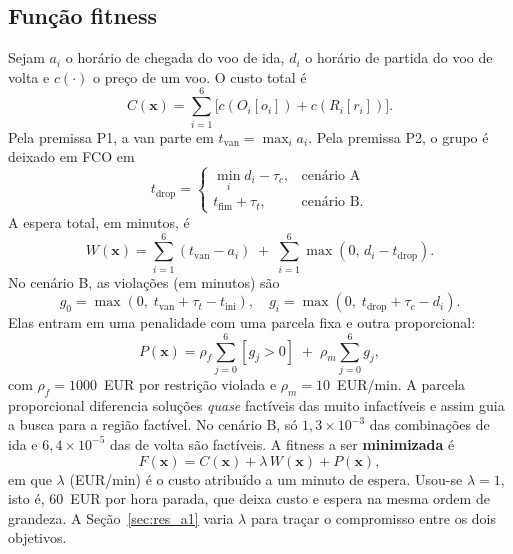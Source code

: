 \documentclass[conference]{IEEEtran}
\begin{document}
\subsection{Função fitness}
Sejam $a_i$ o horário de chegada do voo de ida, $d_i$ o horário de partida do voo de volta e $c(\cdot)$ o preço de um voo. O custo total é
\begin{equation}
C(\mathbf{x})=\sum_{i=1}^{6}\big[c(O_i[o_i])+c(R_i[r_i])\big].
\end{equation}
Pela premissa P1, a van parte em $t_{\text{van}}=\max_i a_i$. Pela premissa P2, o grupo é deixado em FCO em
\begin{equation}
t_{\text{drop}}=\begin{cases}\min_i d_i-\tau_c, & \text{cenário A}\\ t_{\text{fim}}+\tau_t, & \text{cenário B.}\end{cases}
\end{equation}
A espera total, em minutos, é
\begin{equation}
W(\mathbf{x})=\sum_{i=1}^{6}(t_{\text{van}}-a_i)\;+\;\sum_{i=1}^{6}\max(0,\,d_i-t_{\text{drop}}).
\end{equation}
No cenário B, as violações (em minutos) são
\begin{equation}
g_0=\max(0,\;t_{\text{van}}+\tau_t-t_{\text{ini}}),\quad
g_i=\max(0,\;t_{\text{drop}}+\tau_c-d_i).
\end{equation}
Elas entram em uma penalidade com uma parcela fixa e outra proporcional:
\begin{equation}
P(\mathbf{x})=\rho_f\sum_{j=0}^{6}[g_j>0]\;+\;\rho_m\sum_{j=0}^{6}g_j,
\end{equation}
com $\rho_f=1000$~EUR por restrição violada e $\rho_m=10$~EUR/min. A parcela proporcional diferencia soluções \emph{quase} factíveis das muito infactíveis e assim guia a busca para a região factível. No cenário B, só $1{,}3\times10^{-3}$ das combinações de ida e $6{,}4\times10^{-5}$ das de volta são factíveis. A fitness a ser \textbf{minimizada} é
\begin{equation}
F(\mathbf{x})=C(\mathbf{x})+\lambda\,W(\mathbf{x})+P(\mathbf{x}),
\label{eq:fitness}
\end{equation}
em que $\lambda$ (EUR/min) é o custo atribuído a um minuto de espera. Usou-se $\lambda=1$, isto é, 60~EUR por hora parada, que deixa custo e espera na mesma ordem de grandeza. A Seção~\ref{sec:res_a1} varia $\lambda$ para traçar o compromisso entre os dois objetivos.
\end{document}
